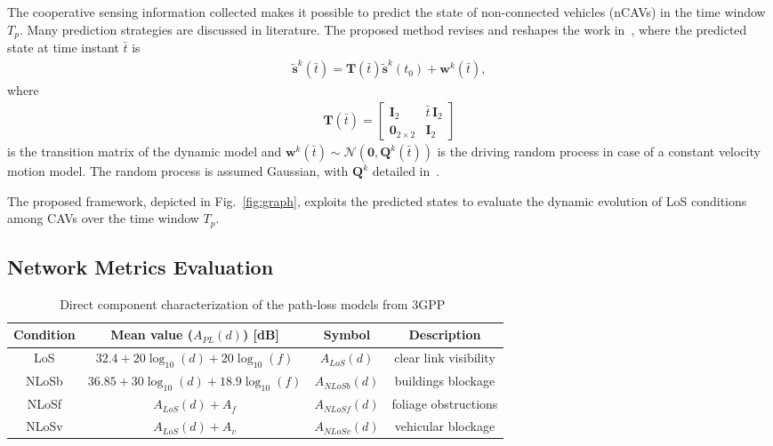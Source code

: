\documentclass[journal]{IEEEtran}
\begin{document}
The cooperative sensing information collected makes it possible to predict the state of non-connected vehicles (nCAVs) in the time window $T_p$. Many prediction strategies are discussed in literature. The proposed method revises and reshapes the work in~\cite{track, soatti1, negar}, where the predicted state at time instant $\bar{t}$ is
\begin{align} \label{eq:pred_pos}
     \mathbf{\tilde{s}}^{k} (\bar{t}) = \mathbf{T}(\bar{t}) \mathbf{\tilde{s}}^{k} ({t}_0) + \mathbf{w}^{k} (\bar{t}), 
\end{align}
where
\begin{align}
    \mathbf{T}(\bar{t}) = \begin{bmatrix}
\mathbf{I}_2 & \bar{t}\,\mathbf{I}_2 \\
\mathbf{0}_{2 \times 2} & \mathbf{I}_2
\end{bmatrix}
\end{align}
is the transition matrix of the dynamic model %
and $\mathbf{w}^k (\bar{t}) \sim \mathcal{N} \left(\mathbf{0}, \mathbf{Q}^k \left(\bar{t}\right)\right)$ is the driving random process in case of a constant velocity motion model. The random process is assumed Gaussian, with $\mathbf{Q}^k$ detailed in~\cite{1458284}.

The proposed framework, depicted in Fig.~\ref{fig:graph}, exploits the predicted states to evaluate the dynamic evolution of LoS conditions among CAVs over the time window $T_p$. %

\subsection{Network Metrics Evaluation} \label{sec:metrics}

\begin{table*}[t] 
\centering
\begin{small}
\begin{tabular}{ | c | c | c | c |}
	\hline
	\textbf{Condition}  & \textbf{Mean value} ($A_{PL}(d)$) [dB] & \textbf{Symbol} & \textbf{Description} \\ \hline \hline
	LoS & $32.4+20\log_{10}(d)+20\log_{10}(f)$ & $A_{LoS}(d)$ & clear link visibility \\ 
	NLoSb &  $36.85+30\log_{10}(d)+ 18.9\log_{10}(f)$  & $A_{NLoSb}(d)$ & buildings blockage \\ 
	NLoSf & $A_{LoS}(d) + A_{f}$  & $A_{NLoSf}(d)$ & foliage obstructions\\
	NLoSv & $A_{LoS}(d) + A_{v}$  & $A_{NLoSv}(d)$ & vehicular blockage \\ \hline
	\end{tabular}
\caption{Direct component characterization of the path-loss models from 3GPP~\cite{14rel, itu, goldhirsh}}
\label{PL}
\end{small}
\end{table*}
\end{document}
